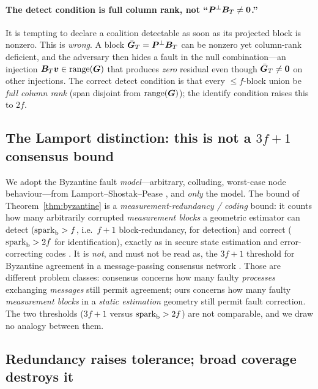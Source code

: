 \paragraph{The detect condition is full column rank, not ``$\bm{P}^{\perp}\bm{B}_T\neq\bm0$.''}
It is tempting to declare a coalition detectable as soon as its projected block is nonzero.
This is \emph{wrong}. A block $\bar{\bm{G}}_T=\bm{P}^{\perp}\bm{B}_T$ can be nonzero yet column-rank
deficient, and the adversary then hides a fault in the null combination---an injection
$\bm{B}_T\bm v\in\operatorname{range}(\bm{G})$ that produces \emph{zero} residual even though $\bar{\bm{G}}_T\neq
\bm0$ on other injections. The correct detect condition is that every $\le f$-block union be
\emph{full column rank} (span disjoint from $\operatorname{range}(\bm{G})$); the identify condition raises
this to $2f$.

\subsection{The Lamport distinction: this is not a \texorpdfstring{$3f+1$}{3f+1} consensus bound}
\label{sec:lamport}

We adopt the Byzantine fault \emph{model}---arbitrary, colluding, worst-case node
behaviour---from Lamport--Shostak--Pease \citep{lamport1982}, and \emph{only} the model. The
bound of Theorem~\ref{thm:byzantine} is a \emph{measurement-redundancy / coding} bound: it
counts how many arbitrarily corrupted \emph{measurement blocks} a geometric estimator can
detect ($\operatorname{spark}_{\mathrm b}>f$, i.e.\ $f+1$ block-redundancy, for detection) and correct
($\operatorname{spark}_{\mathrm b}>2f$ for identification), exactly as in secure state estimation and
error-correcting codes
\citep{fawzi2014,shoukry2016,candes2005,donoho2003}. It is \emph{not}, and must not be read
as, the $3f+1$ threshold for Byzantine agreement in a message-passing consensus network
\citep{lamport1982}. Those are different problem classes: consensus concerns how many
faulty \emph{processes} exchanging \emph{messages} still permit agreement; ours concerns how
many faulty \emph{measurement blocks} in a \emph{static estimation} geometry still permit
fault correction. The two thresholds ($3f+1$ versus $\operatorname{spark}_{\mathrm b}>2f$) are not
comparable, and we draw no analogy between them.

\subsection{Redundancy raises tolerance; broad coverage destroys it}
\label{sec:counts}

